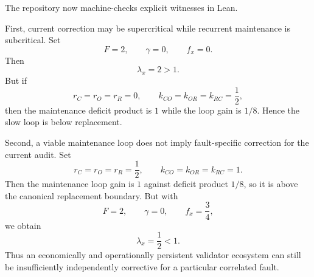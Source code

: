 The repository now machine-checks explicit witnesses in Lean.

First, current correction may be supercritical while recurrent maintenance is subcritical. Set
\[
F=2,\qquad \gamma=0,\qquad f_x=0.
\]
Then
\[
\lambda_x=2>1.
\]
But if
\[
r_C=r_O=r_R=0,
\qquad
k_{CO}=k_{OR}=k_{RC}=\frac12,
\]
then the maintenance deficit product is $1$ while the loop gain is $1/8$. Hence the slow loop is below replacement.

Second, a viable maintenance loop does not imply fault-specific correction for the current audit. Set
\[
r_C=r_O=r_R=\frac12,
\qquad
k_{CO}=k_{OR}=k_{RC}=1.
\]
Then the maintenance loop gain is $1$ against deficit product $1/8$, so it is above the canonical replacement boundary. But with
\[
F=2,\qquad \gamma=0,\qquad f_x=\frac34,
\]
we obtain
\[
\lambda_x=\frac12<1.
\]
Thus an economically and operationally persistent validator ecosystem can still be insufficiently independently corrective for a particular correlated fault.

